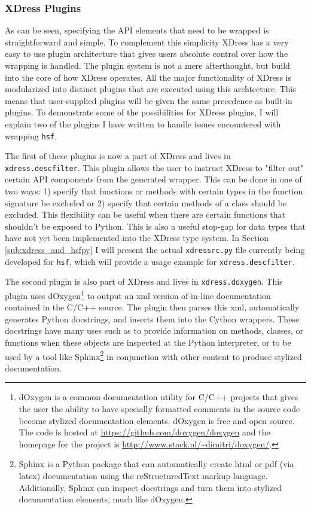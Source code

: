   \subsubsection{XDress Plugins} \label{ssub:xdress_plugins}

    As can be seen, specifying the API elements that need to be wrapped is straightforward and simple. To complement this simplicity XDress has a very easy to use plugin architecture that gives users absolute control over how the wrapping is handled. The plugin system is not a mere afterthought, but build into the core of how XDress operates. All the major functionality of XDress is modularized into distinct plugins that are executed using this archtecture. This means that user-supplied plugins will be given the same precedence as built-in plugins. To demonstrate some of the possibilities for XDress plugins, I will explain two of the plugins I have written to handle issues encountered with wrapping \texttt{hsf}.

    The first of these plugins is now a part of XDress and lives in \texttt{xdress.descfilter}. This plugin allows the user to instruct XDress to "filter out" certain API components from the generated wrapper. This can be done in one of two ways: 1) specify that functions or methods with certain types in the function signature be excluded or 2) specify that certain methods of a class should be excluded. This flexibility can be useful when there are certain functions that shouldn't be exposed to Python. This is also a useful stop-gap for data types that have not yet been implemented into the XDress type system. In Section \ref{sub:xdress_and_hsfpy} I will present the actual \texttt{xdressrc.py} file currently being developed for \texttt{hsf}, which will provide a usage example for \texttt{xdress.descfilter}.

    The second plugin is also part of XDress and lives in  \texttt{xdress.doxygen}. This plugin uses dOxygen\footnote{dOxygen is a common documentation utility for C/C++ projects that gives the user the ability to have specially formatted comments in the source code become stylized documentation elements. dOxygen is free and open source. The code is hosted at \url{https://github.com/doxygen/doxygen} and the homepage for the project is \url{http://www.stack.nl/~dimitri/doxygen/}.} to output an xml version of in-line documentation contained in the C/C++ source. The plugin then parses this xml, automatically generates Python docstrings, and inserts them into the Cython wrappers. These docstrings have many uses such as to provide information on methods, classes, or functions when these objects are inspected at the Python interpreter, or to be used by a tool like Sphinx\footnote{Sphinx is a Python package that can automatically create html or pdf (via latex) documentation using the reStructuredText markup language. Additionally, Sphinx can inspect docstrings and turn them into stylized documentation elements, much like dOxygen.} in conjunction with other content to produce stylized documentation.

